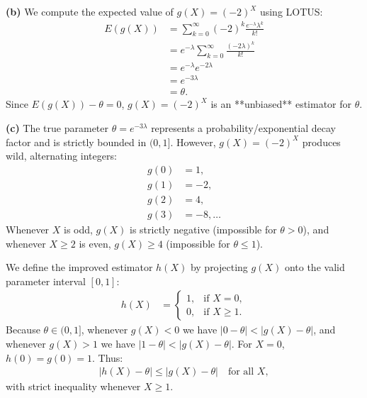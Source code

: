 \documentclass[11pt,a4paper]{article}
\begin{document}
\vspace{4pt}
\noindent \textbf{(b)} We compute the expected value of $g(X) = (-2)^X$ using LOTUS:
\begin{align*}
E(g(X)) &= \sum_{k=0}^{\infty} (-2)^k \frac{e^{-\lambda} \lambda^k}{k!} \\
&= e^{-\lambda} \sum_{k=0}^{\infty} \frac{(-2\lambda)^k}{k!} \\
&= e^{-\lambda} e^{-2\lambda} \\
&= e^{-3\lambda} \\
&= \theta.
\end{align*}
Since $E(g(X)) - \theta = 0$, $g(X) = (-2)^X$ is an **unbiased** estimator for $\theta$.

\vspace{4pt}
\noindent \textbf{(c)} The true parameter $\theta = e^{-3\lambda}$ represents a probability/exponential decay factor and is strictly bounded in $(0, 1]$. However, $g(X) = (-2)^X$ produces wild, alternating integers:
\begin{align*}
g(0) &= 1, \\
g(1) &= -2, \\
g(2) &= 4, \\
g(3) &= -8, \dots
\end{align*}
Whenever $X$ is odd, $g(X)$ is strictly negative (impossible for $\theta > 0$), and whenever $X \ge 2$ is even, $g(X) \ge 4$ (impossible for $\theta \le 1$). 

We define the improved estimator $h(X)$ by projecting $g(X)$ onto the valid parameter interval $[0, 1]$:
\begin{align*}
h(X) &= \begin{cases}
1, & \text{if } X = 0, \\
0, & \text{if } X \ge 1.
\end{cases}
\end{align*}
Because $\theta \in (0, 1]$, whenever $g(X) < 0$ we have $|0 - \theta| < |g(X) - \theta|$, and whenever $g(X) > 1$ we have $|1 - \theta| < |g(X) - \theta|$. For $X = 0$, $h(0) = g(0) = 1$. Thus:
\begin{align*}
|h(X) - \theta| \le |g(X) - \theta| \quad \text{for all } X,
\end{align*}
with strict inequality whenever $X \ge 1$.

\vspace{10pt}
\end{document}
